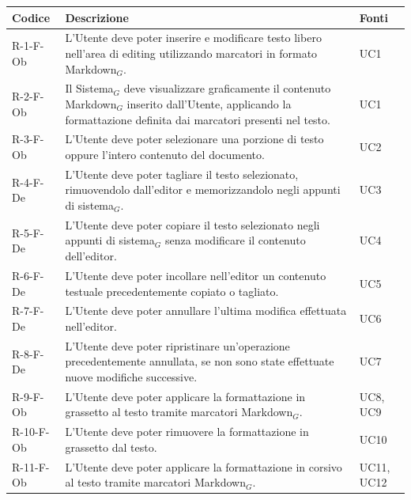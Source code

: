 \documentclass[a4paper, 10pt]{article}
\begin{document}
\begingroup
\small
\renewcommand{\arraystretch}{1.4}
\begin{longtable}{|p{2.2cm}|p{7.5cm}|p{4cm}|}
\hline
\rowcolor[HTML]{EFEFEF}
\textbf{Codice} & \textbf{Descrizione} & \textbf{Fonti} \\ \hline
\endhead

R-1-F-Ob & L'Utente deve poter inserire e modificare testo libero nell'area di editing utilizzando marcatori in formato Markdown$_G$. & UC1 \\ \hline

R-2-F-Ob & Il Sistema$_G$ deve visualizzare graficamente il contenuto Markdown$_G$ inserito dall'Utente, applicando la formattazione definita dai marcatori presenti nel testo. & UC1 \\ \hline

R-3-F-Ob & L'Utente deve poter selezionare una porzione di testo oppure l'intero contenuto del documento. & UC2 \\ \hline

R-4-F-De & L'Utente deve poter tagliare il testo selezionato, rimuovendolo dall'editor e memorizzandolo negli appunti di sistema$_G$. & UC3 \\ \hline

R-5-F-De & L'Utente deve poter copiare il testo selezionato negli appunti di sistema$_G$ senza modificare il contenuto dell'editor. & UC4 \\ \hline

R-6-F-De & L'Utente deve poter incollare nell'editor un contenuto testuale precedentemente copiato o tagliato. & UC5 \\ \hline

R-7-F-De & L'Utente deve poter annullare l'ultima modifica effettuata nell'editor. & UC6 \\ \hline

R-8-F-De & L'Utente deve poter ripristinare un'operazione precedentemente annullata, se non sono state effettuate nuove modifiche successive. & UC7 \\ \hline

R-9-F-Ob & L'Utente deve poter applicare la formattazione in grassetto al testo tramite marcatori Markdown$_G$. & UC8, UC9 \\ \hline

R-10-F-Ob & L'Utente deve poter rimuovere la formattazione in grassetto dal testo. & UC10 \\ \hline

R-11-F-Ob & L'Utente deve poter applicare la formattazione in corsivo al testo tramite marcatori Markdown$_G$. & UC11, UC12 \\ \hline


\end{longtable}
\end{document}

